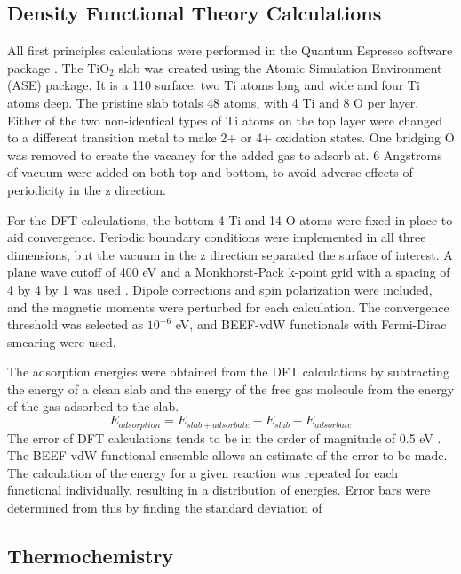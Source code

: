 \documentclass[catalysts,article,submit,moreauthors,pdftex,10pt,a4paper]{mdpi}
\theoremstyle{mdpi}
\newcounter{re}
\theoremstyle{mdpidefinition}
\begin{document}
\subsection{Density Functional Theory Calculations}
All first principles calculations were performed in the Quantum Espresso software package \cite{QE-2009}.
The TiO$_2$ slab was created using the Atomic Simulation Environment (ASE) package. It is a 110 surface, two Ti atoms long and wide and four Ti atoms deep. The pristine slab totals 48 atoms, with 4 Ti and 8 O per layer. Either of the two non-identical types of Ti atoms on the top layer were changed to a different transition metal to make 2+ or 4+ oxidation states. One bridging O was removed to create the vacancy for the added gas to adsorb at. 6 Angstroms of vacuum were added on both top and bottom, to avoid adverse effects of periodicity in the z direction.

For the DFT calculations, the bottom 4 Ti and 14 O atoms were fixed in place to aid convergence. Periodic boundary conditions were implemented in all three dimensions, but the vacuum in the z direction separated the surface of interest. A plane wave cutoff of 400 eV and a Monkhorst-Pack k-point grid with a spacing of 4 by 4 by 1 was used \cite{Monkhorst_1976}. Dipole corrections and spin polarization were included, and the magnetic moments were perturbed for each calculation. The convergence threshold was selected as $10^{-6}$ eV, and BEEF-vdW functionals \cite{Wellendorff_2012} with Fermi-Dirac smearing were used.

The adsorption energies were obtained from the DFT calculations by subtracting the energy of a clean slab and the energy of the free gas molecule from the energy of the gas adsorbed to the slab.
\begin{equation}
E_{adsorption} = E_{slab+adsorbate} - E_{slab} - E_{adsorbate}
\end{equation}
The error of DFT calculations tends to be in the order of magnitude of 0.5 eV \cite{Gautier_2015}. The BEEF-vdW functional ensemble allows an estimate of the error to be made. The calculation of the energy for a given reaction was repeated for each functional individually, resulting in a distribution of energies. Error bars were determined from this by finding the standard deviation of 

\subsection{Thermochemistry}
\cite{ase-paper,Reuter_2005}
\end{document}
